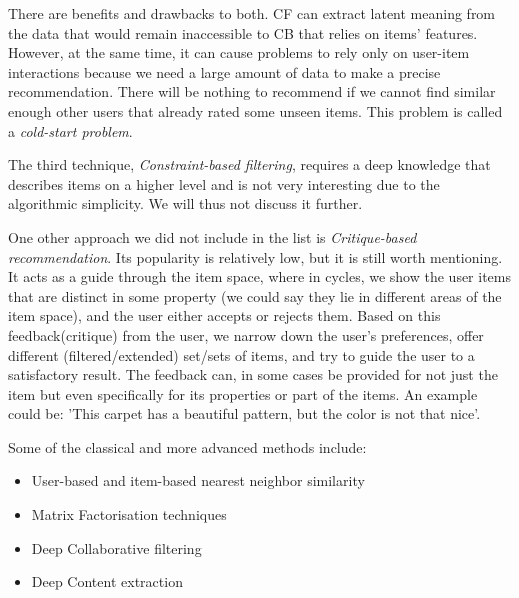 There are benefits and drawbacks to both. CF can extract latent meaning from the data that would remain inaccessible to CB that relies on items' features. However, at the same time, it can cause problems to rely only on user-item interactions because we need a large amount of data to make a precise recommendation. There will be nothing to recommend if we cannot find similar enough other users that already rated some unseen items. This problem is called a \textit{cold-start problem}.

The third technique, \textit{Constraint-based filtering}, requires a deep knowledge that describes items on a higher level and is not very interesting due to the algorithmic simplicity. We will thus not discuss it further.

One other approach we did not include in the list is \textit{Critique-based recommendation}. Its popularity is relatively low, but it is still worth mentioning. It acts as a guide through the item space, where in cycles, we show the user items that are distinct in some property (we could say they lie in different areas of the item space), and the user either accepts or rejects them. Based on this feedback(critique) from the user, we narrow down the user's preferences, offer different (filtered/extended) set/sets of items, and try to guide the user to a satisfactory result. The feedback can, in some cases be provided for not just the item but even specifically for its properties or part of the items. An example could be: 'This carpet has a beautiful pattern, but the color is not that nice'.


Some of the classical and more advanced methods include:
\begin{itemize}
    \item User-based and item-based nearest neighbor similarity \cite{hill1995recommending}\cite{shardanand1995social}\cite{balabanovic1997fab}
    \item Matrix Factorisation techniques\cite{koren2009matrix}
    \item Deep Collaborative filtering \cite{he2017neural}\cite{YOUTUBE_deeprec-covington2016}\cite{DeepLearningBasedRecommenderSystem_zhang2019deep}
    \item Deep Content extraction\cite{DeepLearningBasedRecommenderSystem_zhang2019deep}
\end{itemize}



